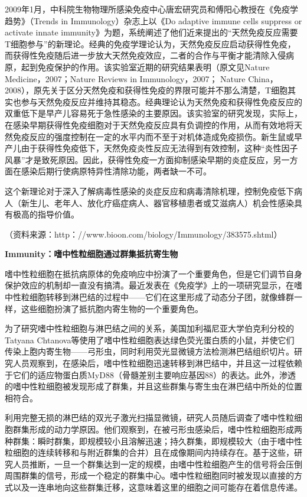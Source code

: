 2009年1月，中科院生物物理所感染免疫中心唐宏研究员和傅阳心教授在《免疫学趋势》（Trends
in Immunology）杂志上以《Do adaptive immune cells suppress or activate
innate
immunity》为题，系统阐述了他们近来提出的“天然免疫反应需要T细胞参与”的新理论。经典的免疫学理论认为，天然免疫反应启动获得性免疫，而获得性免疫随后进一步放大天然免疫效应，二者的合作与平衡才能清除入侵病原，起到免疫保护的作用。该实验室近期的研究结果表明（原文见Nature
Medicine，2007；Nature Reviews in Immunology，2007； Nature
China，2008），原先关于区分天然免疫和获得性免疫的界限可能并不那么清楚，T细胞其实也参与天然免疫反应并维持其稳态。经典理论认为天然免疫和获得性免疫反应的双重低下是早产儿容易死于急性感染的主要原因。该实验室的研究发现，实际上，在感染早期获得性免疫细胞对于天然免疫反应具有负调控的作用，从而有效地将天然免疫反应的强度控制在一定的水平内而不至于对机体造成免疫损伤。新生鼠或早产儿由于获得性免疫低下，天然免疫炎性反应无法得到有效控制，这种“炎性因子风暴”才是致死原因。因此，获得性免疫一方面抑制感染早期的炎症反应，另一方面在感染后期行使病原特异性清除功能，两者缺一不可。

这个新理论对于深入了解病毒性感染的炎症反应和病毒清除机理，控制免疫低下病人（新生儿、老年人、放化疗癌症病人、器官移植患者或艾滋病人）机会性感染具有极高的指导价值。

（资料来源：http：//www.bioon.com/biology/Immunology/383575.shtml）

\begin{center}
\textbf{\Large Immunity：嗜中性粒细胞通过群集抵抗寄生物}
\end{center}

嗜中性粒细胞在抵抗病原体的免疫响应中扮演了一个重要角色，但是它们调节自身保护效应的机制却一直没有搞清。最近发表在《免疫学》上的一项研究显示，在嗜中性粒细胞转移到淋巴结的过程中------它们在这里形成了动态分子团，就像蜂群一样，这些细胞扮演了抵抗胞内寄生物的一个重要角色。

为了研究嗜中性粒细胞与淋巴结之间的关系，美国加利福尼亚大学伯克利分校的Tatyana
Chtanova等使用了嗜中性粒细胞表达绿色荧光蛋白质的小鼠，并使它们传染上胞内寄生物------弓形虫，同时利用荧光显微镜方法检测淋巴结组织切片。研究人员观察到，在感染后，嗜中性粒细胞迅速转移到淋巴结中，并且这一过程依赖于它们的适应物蛋白质MyD88（骨髓差别主要响应基因88）的表达。此外，渗透的嗜中性粒细胞被发现形成了群集，并且这些群集与寄生虫在淋巴结中所处的位置相符合。

利用完整无损的淋巴结的双光子激光扫描显微镜，研究人员随后调查了嗜中性粒细胞群集形成的动力学原因。他们观察到，在被弓形虫感染后，嗜中性粒细胞形成两种群集：瞬时群集，即规模较小且溶解迅速；持久群集，即规模较大（由于嗜中性粒细胞的连续转移和与附近群集的合并）且在成像期间内持续存在。基于这些，研究人员推断，一旦一个群集达到一定的规模，由嗜中性粒细胞产生的信号将会压倒周围群集的信号，形成一个稳定的群集中心。嗜中性粒细胞同时被发现以直接的方式以及一连串地向这些群集迁移，这意味着这里的细胞之间可能存在着信息传递。

